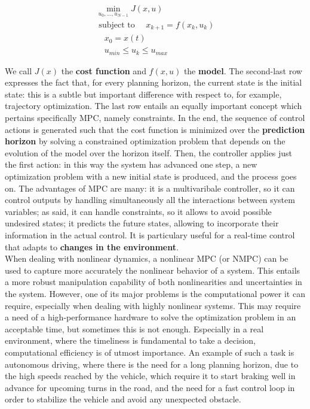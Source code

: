 \documentclass[a4paper, onecolumn, 12pt]{article}
\begin{document}
\begin{equation}
\begin{aligned}
    \min_{u_0,...,u_{N-1}}{J(x,u)} \\
    \text{ subject to }
        \quad x_{k+1} = f(x_k,u_k) \\
        \quad x_0 = x(t) \\
        \quad u_{min} \leq u_k \leq u_{max}
\end{aligned}
\end{equation}

We call $J(x)$ the \textbf{cost function} and $f(x,u)$ the \textbf{model}. The
second-last row expresses the fact that, for every planning horizon, the current
state is the initial state: this is a subtle but important difference with
respect to, for example, trajectory optimization. The last row entails an
equally important concept which pertains specifically MPC, namely constraints.
In the end, the sequence of control actions is generated such that the cost
function is minimized over the \textbf{prediction horizon} by solving a
constrained optimization problem that depends on the evolution of the model over
the horizon itself. Then, the controller applies just the first action: in this
way the system has advanced one step, a new optimization problem with a new
initial state is produced, and the process goes on. The advantages of MPC are
many: it is a multivaribale controller, so it can control outputs by handling
simultaneously all the interactions between system variables; as said, it can
handle constraints, so it allows to avoid possible undesired states; it predicts
the future states, allowing to incorporate their information in the actual
control. It is particulary useful for a real-time control that adapts to
\textbf{changes in the environment}.\\
When dealing with nonlinear dynamics, a nonlinear MPC (or NMPC) can be used to
capture more accurately the nonlinear behavior of a system. This entails a more
robust manipulation capability of both nonlinearities and uncertainties in the
system. However, one of its major problems is the computational power it can
require, especially when dealing with highly nonlinear systems. This may require
a need of a high-performance hardware to solve the optimization problem in an
acceptable time, but sometimes this is not enough. Especially in a real
environment, where the timeliness is fundamental to take a decision,
computational efficiency is of utmost importance. An example of such a task is
autonomous driving, where there is the need for a long planning horizon, due to
the high speeds reached by the vehicle, which require it to start braking well
in advance for upcoming turns in the road, and the need for a fast control loop
in order to stabilize the vehicle and avoid any unexpected obstacle.
\end{document}
